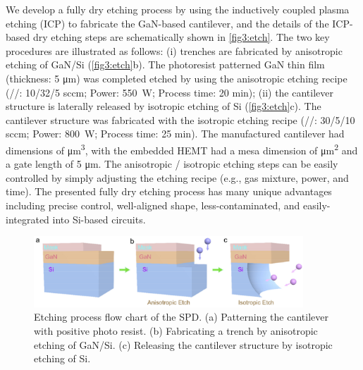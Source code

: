 We develop a fully dry etching  process by using the inductively coupled plasma etching (ICP)  to fabricate the GaN-based  cantilever, and the details of the ICP-based dry etching steps are schematically shown in \autoref{fig3:etch}. The two key procedures are illustrated as follows: (i) trenches are fabricated by anisotropic etching  of GaN/Si (\autoref{fig3:etch}b). The photoresist  patterned GaN  thin film (thickness: 5 \unit{\um}) was completed etched by using the anisotropic etching recipe (//: 10/32/5 sccm; Power: \SI{550}{\watt}; Process time: 20 \unit{\minute}); (ii) the cantilever  structure is laterally released by isotropic etching of Si (\autoref{fig3:etch}c). The cantilever  structure was fabricated with the isotropic etching recipe (//: 30/5/10 sccm; Power: \SI{800}{\watt}; Process time: 25 \unit{\minute}). The manufactured cantilever  had dimensions of  \unit{\cubic\um}, with the embedded HEMT had a mesa dimension of  \unit{\square\um} and a gate length of 5 \unit{\um}. The anisotropic / isotropic etching  steps can be easily controlled by simply adjusting the etching recipe (e.g., gas mixture, power, and time). The presented fully dry etching process has many unique advantages including precise control, well-aligned shape, less-contaminated, and easily-integrated into Si-based circuits.

\begin{figure}[H] 
\centering    
\includegraphics[width=0.9\textwidth]{ch3_etch}
\caption[Etching process flow chart of the SPD]{Etching process flow chart of the SPD. (a) Patterning the cantilever with positive photo resist. (b) Fabricating a trench by anisotropic etching of GaN/Si. (c) Releasing the cantilever structure by isotropic etching of Si.}
\label{fig3:etch}
\end{figure}

